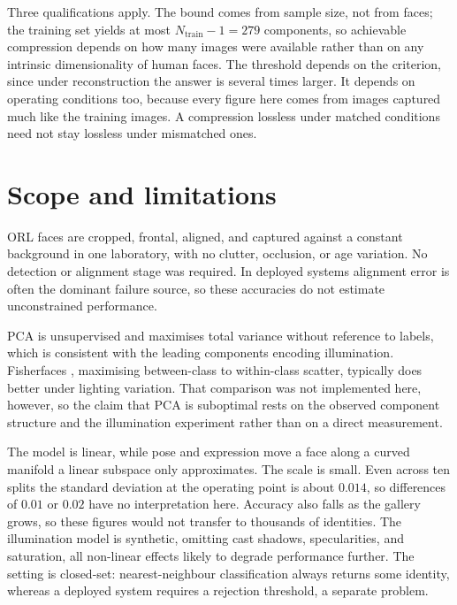 \documentclass[10pt,a4paper]{article}
\begin{document}
Three qualifications apply. The bound comes from sample size, not from faces;
the training set yields at most $N_{\text{train}}-1=279$ components, so
achievable compression depends on how many images were available rather than
on any intrinsic dimensionality of human faces. The threshold depends on the
criterion, since under reconstruction the answer is several times larger. It
depends on operating conditions too, because every figure here comes from
images captured much like the training images. A compression lossless under
matched conditions need not stay lossless under mismatched ones.

\section{Scope and limitations}

ORL faces are cropped, frontal, aligned, and captured against a constant
background in one laboratory, with no clutter, occlusion, or age variation. No
detection or alignment stage was required. In deployed systems alignment error
is often the dominant failure source, so these accuracies do not estimate
unconstrained performance.

PCA is unsupervised and maximises total variance without reference to labels,
which is consistent with the leading components encoding illumination.
Fisherfaces \citep{belhumeur1997}, maximising between-class to within-class
scatter, typically does better under lighting variation. That comparison was
not implemented here, however, so the claim that PCA is suboptimal rests on the
observed component structure and the illumination experiment rather than on a
direct measurement.

The model is linear, while pose and expression move a face along a curved
manifold a linear subspace only approximates. The scale is small. Even across
ten splits the standard deviation at the operating point is about $0.014$, so
differences of $0.01$ or $0.02$ have no interpretation here. Accuracy also
falls as the gallery grows, so these figures would not transfer to thousands of
identities. The illumination model is synthetic, omitting cast shadows,
specularities, and saturation, all non-linear effects likely to degrade
performance further. The setting is closed-set: nearest-neighbour
classification always returns some identity, whereas a deployed system requires a
rejection threshold, a separate problem.
\end{document}
